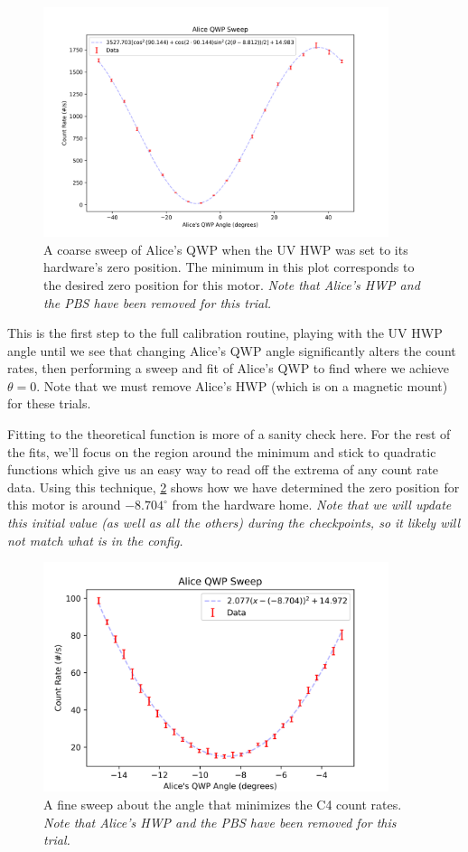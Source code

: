 \documentclass{paper}[11pt]
\begin{document}
	\begin{figure}[p]
		\centering
		\includegraphics[width=0.9\textwidth]{AQWP/AQWP_fit.png}
		\caption{A coarse sweep of Alice's QWP when the UV HWP was set to its hardware's zero position. The minimum in this plot corresponds to the desired zero position for this motor. \textit{Note that Alice's HWP and the PBS have been removed for this trial.}}
		\label{fig:AQWP theory fit}
	\end{figure}
	This is the first step to the full calibration routine, playing with the UV HWP angle until we see that changing Alice's QWP angle significantly alters the count rates, then performing a sweep and fit of Alice's QWP to find where we achieve $\theta=0$. Note that we must remove Alice's HWP (which is on a magnetic mount) for these trials.
	
	Fitting to the theoretical function is more of a sanity check here. For the rest of the fits, we'll focus on the region around the minimum and stick to quadratic functions which give us an easy way to read off the extrema of any count rate data. Using this technique, \cref{fig:AQWP minimum fit} shows how we have determined the zero position for this motor is around $-8.704^\circ$ from the hardware home. \textit{Note that we will update this initial value (as well as all the others) during the checkpoints, so it likely will not match what is in the config.}
	
	\begin{figure}[p]
		\centering
		\includegraphics[width=0.9\textwidth]{AQWP/AQWP_sweep2.png}
		\caption{A fine sweep about the angle that minimizes the C4 count rates. \textit{Note that Alice's HWP and the PBS have been removed for this trial.}}
		\label{fig:AQWP minimum fit}
	\end{figure}
	
\end{document}
